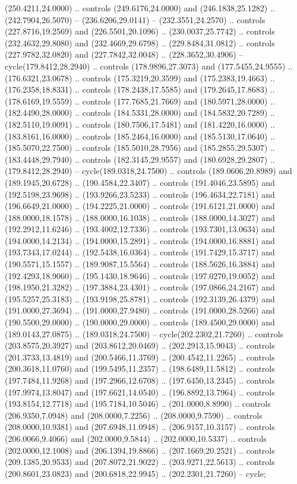   (250.4211,24.0000) .. controls (249.6176,24.0000) and (246.1838,25.1282) ..
  (242.7904,26.5070) -- (236.6206,29.0141) -- (232.3551,24.2570) .. controls
  (227.8716,19.2569) and (226.5501,20.1096) .. (230.0037,25.7742) .. controls
  (232.4632,29.8080) and (232.4669,29.6798) .. (229.8484,31.0812) .. controls
  (227.9782,32.0820) and (227.7842,32.0048) .. (228.3652,30.4906) --
  cycle(179.8412,28.2940) .. controls (178.9896,27.3073) and (177.5455,24.9555)
  .. (176.6321,23.0678) .. controls (175.3219,20.3599) and (175.2383,19.4663) ..
  (176.2358,18.8331) .. controls (178.2438,17.5585) and (179.2645,17.8683) ..
  (178.6169,19.5559) .. controls (177.7685,21.7669) and (180.5971,28.0000) ..
  (182.4490,28.0000) .. controls (184.5331,28.0000) and (184.5832,20.7289) ..
  (182.5110,19.0091) .. controls (180.7506,17.5481) and (181.4220,16.0000) ..
  (183.8161,16.0000) .. controls (185.2464,16.0000) and (185.5130,17.0640) ..
  (185.5070,22.7500) .. controls (185.5010,28.7956) and (185.2855,29.5307) ..
  (183.4448,29.7940) .. controls (182.3145,29.9557) and (180.6928,29.2807) ..
  (179.8412,28.2940) -- cycle(189.0318,24.7500) .. controls (189.0606,20.8989)
  and (189.1945,20.6728) .. (190.4584,22.3407) .. controls (191.4046,23.5895)
  and (192.5198,23.9698) .. (193.9266,23.5233) .. controls (196.4634,22.7181)
  and (196.6649,21.0000) .. (194.2225,21.0000) .. controls (191.6121,21.0000)
  and (188.0000,18.1578) .. (188.0000,16.1038) .. controls (188.0000,14.3027)
  and (192.2912,11.6246) .. (193.4002,12.7336) .. controls (193.7301,13.0634)
  and (194.0000,14.2134) .. (194.0000,15.2891) .. controls (194.0000,16.8881)
  and (193.7343,17.0244) .. (192.5438,16.0364) .. controls (191.7429,15.3717)
  and (190.5571,15.1557) .. (189.9087,15.5564) .. controls (188.5626,16.3884)
  and (192.4293,18.9060) .. (195.1430,18.9646) .. controls (197.0270,19.0052)
  and (198.1950,21.3282) .. (197.3884,23.4301) .. controls (197.0866,24.2167)
  and (195.5257,25.3183) .. (193.9198,25.8781) .. controls (192.3139,26.4379)
  and (191.0000,27.3694) .. (191.0000,27.9480) .. controls (191.0000,28.5266)
  and (190.5500,29.0000) .. (190.0000,29.0000) .. controls (189.4500,29.0000)
  and (189.0143,27.0875) .. (189.0318,24.7500) -- cycle(202.2302,21.7260) ..
  controls (203.8575,20.3927) and (203.8612,20.0469) .. (202.2913,15.9043) ..
  controls (201.3733,13.4819) and (200.5466,11.3769) .. (200.4542,11.2265) ..
  controls (200.3618,11.0760) and (199.5495,11.2357) .. (198.6489,11.5812) ..
  controls (197.7484,11.9268) and (197.2966,12.6708) .. (197.6450,13.2345) ..
  controls (197.9974,13.8047) and (197.6621,14.0540) .. (196.8892,13.7964) ..
  controls (193.8154,12.7718) and (195.7184,10.5046) .. (201.0000,8.8990) ..
  controls (206.9350,7.0948) and (208.0000,7.2256) .. (208.0000,9.7590) ..
  controls (208.0000,10.9381) and (207.6948,11.0948) .. (206.9157,10.3157) ..
  controls (206.0066,9.4066) and (202.0000,9.5844) .. (202.0000,10.5337) ..
  controls (202.0000,12.1008) and (206.1394,19.8866) .. (207.1669,20.2521) ..
  controls (209.1385,20.9533) and (207.8072,21.9022) .. (203.9271,22.5613) ..
  controls (200.8601,23.0823) and (200.6818,22.9945) .. (202.2301,21.7260) --
  cycle;

